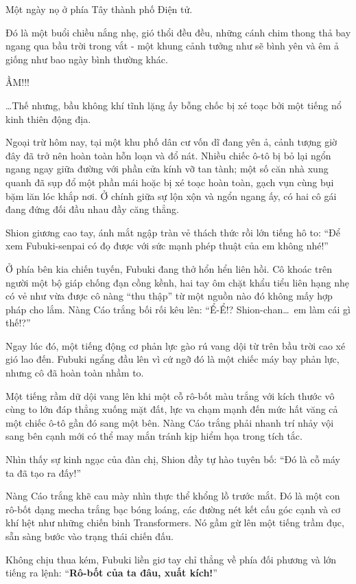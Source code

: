 \documentclass[../main.tex]{subfiles}
\begin{document}
Một ngày nọ ở phía Tây thành phố Điện tử.

Đó là một buổi chiều nắng nhẹ, gió thổi đều đều, những cánh chim thong thả bay ngang qua bầu trời trong vắt - một khung cảnh tưởng như sẽ bình yên và êm ả giống như bao ngày bình thường khác.

  {\Huge ẦM!!!}

\dots Thế nhưng, bầu không khí tĩnh lặng ấy bỗng chốc bị xé toạc bởi một tiếng nổ kinh thiên động địa.

Ngoại trừ hôm nay, tại một khu phố dân cư vốn dĩ đang yên ả, cảnh tượng giờ đây đã trở nên hoàn toàn hỗn loạn và đổ nát. Nhiều chiếc ô-tô bị bỏ lại ngổn ngang ngay giữa đường với phần cửa kính vỡ tan tành; một số căn nhà xung quanh đã sụp đổ một phần mái hoặc bị xé toạc hoàn toàn, gạch vụn cùng bụi bặm lăn lóc khắp nơi. Ở chính giữa sự lộn xộn và ngổn ngang ấy, có hai cô gái đang đứng đối đầu nhau đầy căng thẳng.

Shion giương cao tay, ánh mắt ngập tràn vẻ thách thức rồi lớn tiếng hô to: ``Để xem Fubuki-senpai có đọ được với sức mạnh phép thuật của em không nhé!''

Ở phía bên kia chiến tuyến, Fubuki đang thở hổn hển liên hồi. Cô khoác trên người một bộ giáp chống đạn cồng kềnh, hai tay ôm chặt khẩu tiểu liên hạng nhẹ có vẻ như vừa được cô nàng ``thu thập'' từ một nguồn nào đó không mấy hợp pháp cho lắm. Nàng Cáo trắng bối rối kêu lên: ``Ể-Ể!? Shion-chan\dots\ em làm cái gì thế!?''

Ngay lúc đó, một tiếng động cơ phản lực gào rú vang dội từ trên bầu trời cao xé gió lao đến. Fubuki ngẩng đầu lên vì cứ ngỡ đó là một chiếc máy bay phản lực, nhưng cô đã hoàn toàn nhầm to.

Một tiếng rầm dữ dội vang lên khi một cỗ rô-bốt màu trắng với kích thước vô cùng to lớn đáp thẳng xuống mặt đất, lực va chạm mạnh đến mức hất văng cả một chiếc ô-tô gần đó sang một bên. Nàng Cáo trắng phải nhanh trí nhảy vội sang bên cạnh mới có thể may mắn tránh kịp hiểm họa trong tích tắc.


Nhìn thấy sự kinh ngạc của đàn chị, Shion đầy tự hào tuyên bố: ``Đó là cỗ máy ta đã tạo ra đấy!''

Nàng Cáo trắng khẽ cau mày nhìn thực thể khổng lồ trước mắt. Đó là một con rô-bốt dạng mecha trắng bạc bóng loáng, các đường nét kết cấu góc cạnh và cơ khí hệt như những chiến binh Transformers. Nó gầm gừ lên một tiếng trầm đục, sẵn sàng bước vào trạng thái chiến đấu.

Không chịu thua kém, Fubuki liền giơ tay chỉ thẳng về phía đối phương và lớn tiếng ra lệnh: ``\textbf{Rô-bốt của ta đâu, xuất kích!}''
\end{document}
